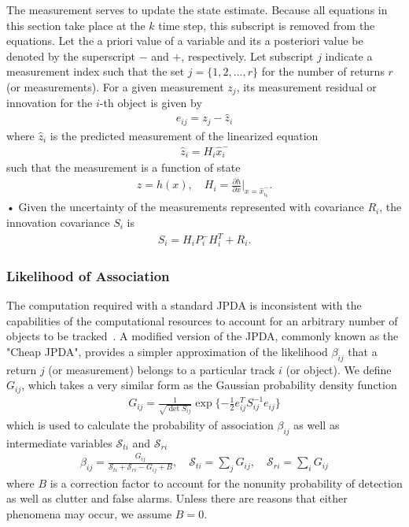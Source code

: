 \documentclass[10pt]{article}
\theoremstyle{plain}\theorembodyfont{\normalfont}
\begin{document}
The measurement serves to update the state estimate. Because all equations in this section take place at the $k$ time step, this subscript is removed from the equations. Let  the a priori value of a variable and its a posteriori value be denoted by the superscript $-$ and $+$, respectively. Let subscript $j$ indicate a measurement index such that the set $j=\{1,2,...,r\}$ for the number of returns $r$ (or measurements). For a given measurement $z_j$, its measurement residual or innovation for the $i$-th object is given by
\begin{align*}
e_{ij} = z_j - \hat z_i
\end{align*}
where $\hat z_i$ is the predicted measurement of the linearized equation
\begin{align}
\hat z_i = H_i \hat x_{i}^-
\end{align}
such that the measurement is a function of state
\begin{align}
z=h(x), \quad H_i=\frac{\partial h}{\partial x}\bigg|_{x=\hat x_{i_{k}}^- }.
\end{align}•
Given the uncertainty of the measurements represented with covariance $R_i$, the innovation covariance $S_{i}$ is
\begin{align}
S_{i}=H_{i}P_{i}^{-}H_{i}^T+R_{i}.
\end{align}




\subsubsection{Likelihood of Association}
The computation required with a standard JPDA is inconsistent with the capabilities of the computational resources to account for an arbitrary number of objects to be tracked~\cite[Eq. 1.(1-2)]{Bar1990}. A modified version of the JPDA, commonly known as the "Cheap JPDA", provides a simpler approximation of the likelihood $\beta_{ij}$ that a return $j$ (or measurement) belongs to a particular track $i$ (or object). We define $G_{ij}$, which takes a very similar form as the Gaussian probability density function
\begin{align}
G_{ij}=\frac1{\sqrt{\det{S_{ij}}}}\exp{\{-\frac12e_{ij}^TS_{ij}^{-1}e_{ij}\}}
\end{align}
which is used to calculate the probability of association $\beta_{ij}$ as well as intermediate variables $\mathcal{S}_{ti}$ and $\mathcal{S}_{ri}$
\begin{align}
\beta_{ij}=\frac{G_{ij}}{\mathcal{S}_{ti}+\mathcal{S}_{ri}-G_{ij}+B}, 
\quad 
\mathcal{S}_{ti}=\sum\limits_{j}G_{ij}, 
\quad 
\mathcal{S}_{ri}=\sum\limits_{i}G_{ij}
\end{align}
where $B$ is a correction factor to account for the nonunity probability of detection as well as clutter and false alarms. Unless there are reasons that either phenomena may occur, we assume $B=0$.
\end{document}
